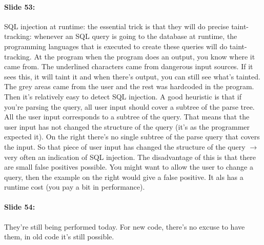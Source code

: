 \documentclass[10pt,a4paper]{report}
\begin{document}
\paragraph{Slide 53:} SQL injection at runtime: the essential trick is that they will do precise taint-tracking:  whenever an SQL query is going to the database at runtime, the programming languages that is executed to create these queries will do taint-tracking. At the program when the program does an output, you know where it came from. The underlined characters came from dangerous input sources. If it sees this, it will taint it and when there's output, you can still see what's tainted. The grey areas came from the user and the rest was hardcoded in the program. Then it's relatively easy to detect SQL injection. A good heuristic is that if you're parsing the query, all user input should cover a subtree of the parse tree. All the user input corresponds to a subtree of the query. That means that the user input has not changed the structure of the query (it's as the programmer expected it). On the right there's no single subtree of the parse query that covers the input. So that piece of user input has changed the structure of the query $\rightarrow$ very often an indication of SQL injection. The disadvantage of this is that there are small false positives possible. You might want to allow the user to change a query, then the example on the right would give a false positive. It als has a runtime cost (you pay a bit in performance).

\paragraph{Slide 54:} They're still being performed today. For new code, there's no excuse to have them, in old code it's still possible. 
\end{document}
